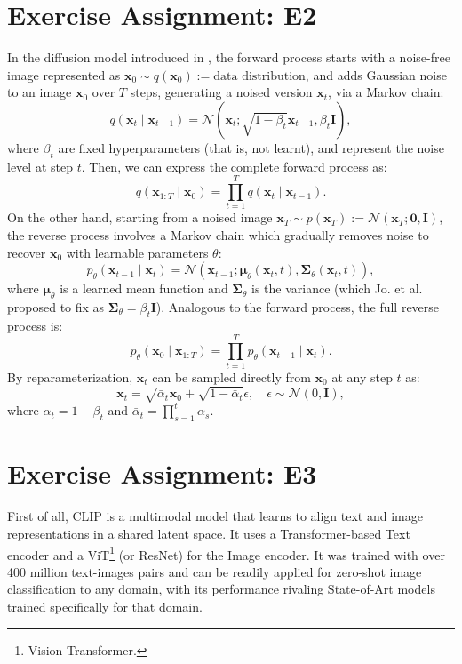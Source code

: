 \documentclass{article}
\begin{document}
\section{Exercise Assignment: E2}\label{sec:e2}
In the diffusion model introduced in \cite{diffusion-models2020}, the forward process starts with a noise-free image represented as \( \mathbf{x}_0 \sim q(\mathbf{x}_0) := \text{data distribution} \), and adds Gaussian noise to an image \( \mathbf{x}_0 \) over \( T \) steps, generating a noised version \( \mathbf{x}_t \), via a Markov chain:
\[
    q(\mathbf{x}_t \mid \mathbf{x}_{t-1}) = \mathcal{N}(\mathbf{x}_t; \sqrt{1 - \beta_t} \mathbf{x}_{t-1}, \beta_t\mathbf{I}),
\]
where \( \beta_t \) are fixed hyperparameters (that is, not learnt), and represent the noise level at step \( t \). Then, we can express the complete forward process as:
\[
    q(\mathbf{x}_{1:T} \mid \mathbf{x}_0) = \prod_{t=1}^T q(\mathbf{x}_t \mid \mathbf{x}_{t-1}).
\]
On the other hand, starting from a noised image \( \mathbf{x}_T \sim p(\mathbf{x}_T) := \mathcal{N}(\mathbf{x}_T; \mathbf{0}, \mathbf{I}) \), the reverse process involves a Markov chain which gradually removes noise to recover \( \mathbf{x}_0 \) with learnable parameters \( \theta \):
\[
    p_\theta(\mathbf{x}_{t-1} \mid \mathbf{x}_t) = \mathcal{N}(\mathbf{x}_{t-1}; \mathbf{\mu}_\theta(\mathbf{x}_t, t), \mathbf{\Sigma}_\theta(\mathbf{x}_t, t)),
\]
where \( \mathbf{\mu}_\theta \) is a learned mean function and \( \mathbf{\Sigma}_\theta \) is the variance (which Jo. et al. \cite{diffusion-models2020} proposed to fix as \( \mathbf{\Sigma}_\theta = \beta_t \mathbf{I} \)). Analogous to the forward process, the full reverse process is:
\[
    p_\theta(\mathbf{x}_0 \mid \mathbf{x}_{1:T}) = \prod_{t=1}^T p_\theta(\mathbf{x}_{t-1} \mid \mathbf{x}_t).
\]
By reparameterization, \( \mathbf{x}_t \) can be sampled directly from \( \mathbf{x}_0 \) at any step \( t \) as:
\[
    \mathbf{x}_t = \sqrt{\bar{\alpha}_t} \mathbf{x}_0 + \sqrt{1 - \bar{\alpha}_t} \epsilon, \quad \epsilon \sim \mathcal{N}(0, \mathbf{I}),
\]
where \( \alpha_t = 1 - \beta_t \) and \( \bar{\alpha}_t = \prod_{s=1}^t \alpha_s \).

\section{Exercise Assignment: E3}\label{sec:e3}

First of all, CLIP \cite{CLIP2021} is a multimodal model that learns to align text and image representations in a shared latent space. It uses a Transformer-based Text encoder and a ViT\footnote{Vision Transformer.} (or ResNet) for the Image encoder. It was trained with over 400 million text-images pairs and can be readily applied for zero-shot image classification to any domain, with its performance rivaling State-of-Art models trained specifically for that domain.
\end{document}

